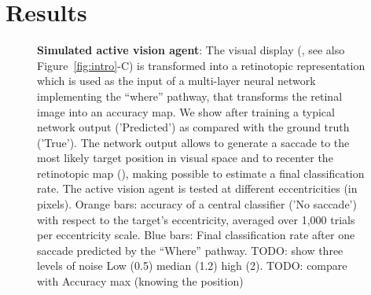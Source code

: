 \section{Results}
\label{sec:results}
\begin{figure}[t!]%
\caption{
{\bf Simulated active vision agent}:
\A The visual display (\DIS , see also  Figure~\ref{fig:intro}-C)  is transformed into a retinotopic representation which is used as the input of a multi-layer neural network implementing the ``where'' pathway, that transforms the retinal image into an accuracy map. %
\B We show after training a typical network output  ('Predicted') as compared  with the ground truth ('True'). %
\C The network output allows to generate a saccade to the most likely target position in visual space and to recenter the retinotopic map (\SAC ), making possible to estimate a final classification rate. %
\D The active vision agent is tested at different eccentricities (in pixels). Orange bars: accuracy of a central classifier ('No saccade') with respect to the target's eccentricity, averaged over 1,000 trials per eccentricity scale. Blue bars: Final classification rate after one saccade predicted by the ``Where'' pathway. TODO: show three levels of noise Low (0.5) median (1.2) high (2). TODO: compare with Accuracy max (knowing the position)
\label{fig:results}}%
\end{figure}%
\ICANN
\else
